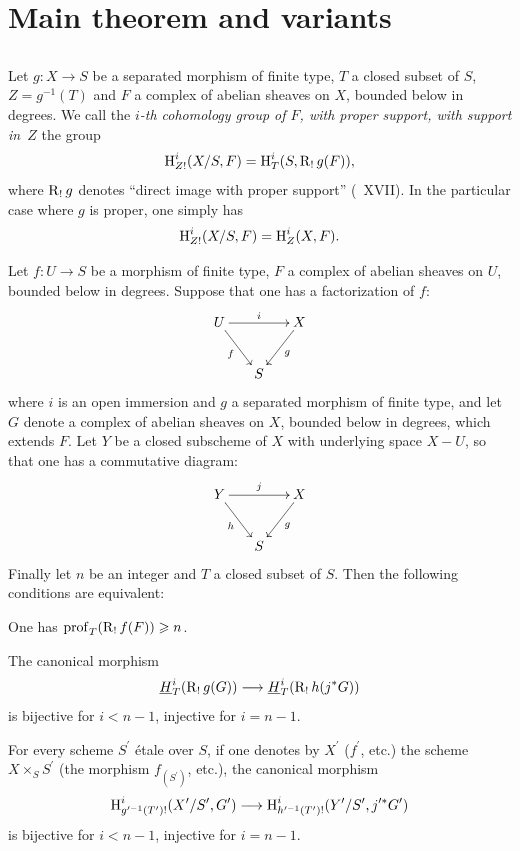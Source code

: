 \section{Main theorem and variants} \label{XIV.4}

\setcounter{subsection}{-1}

\subsection{} \label{XIV.4.0}
Let $g\colon X\to S$ be a separated morphism of finite type, $T$ a closed subset of $S$, \hbox{$Z=g^{-1}(T)$} and $F$ a complex of abelian sheaves on $X$, bounded below in degrees. We call the \emph{$i$-th cohomology group of $F$, with proper support, with support in~$Z$} the group
$$
\operatorname{H}_{Z!}^{i}(X/S, F)=\operatorname{H}_{T}^{i}(S, \operatorname{R}_{!}g(F)),
$$
where $\operatorname{R}_{!}g$ denotes ``direct image with proper support'' (~XVII). In the particular case where $g$ is proper, one simply has
$$
\operatorname{H}_{Z!}^{i}(X/S, F)=\operatorname{H}_{Z}^{i}(X, F).
$$

\begin{proposition} \label{XIV.4.1} Let $f\colon U\to S$ be a morphism of finite type, $F$ a complex of abelian sheaves on $U$, bounded below in degrees. Suppose that one has a factorization of $f$:
$$
\xymatrix@C=15pt{ U\ar[rr]^-{i}\ar[rd]_-{f} & & X\ar[ld]^-{g}\\
& S & }$$
where $i$ is an open immersion and $g$ a separated morphism of finite type, and let $G$ denote a complex of abelian sheaves on $X$, bounded below in degrees, which extends $F$. Let $Y$ be a closed subscheme of $X$ with underlying space $X-U$, so that one has a commutative diagram:
$$
\xymatrix@C=15pt{ Y\ar[rr]^-{j}\ar[rd]_-{h} & & X\ar[ld]^-{g}\\
& S & }$$
Finally let $n$ be an integer and $T$ a closed subset of $S$. Then the following conditions are equivalent:
\begin{enumeratei}
\item
One has $\operatorname{prof}_{T}(\operatorname{R}_{!}f(F))\geqslant n$.
\item
The canonical morphism
$$
\underline{H}_{T}^{i}(\R_{!}g(G))\to\underline{H}_{T}^{i}(\R_{!}h(j^{\ast}G))$$
is bijective for $i<n-1$, injective for $i=n-1$.
\item
For every scheme $S^{\prime}$ \'etale over $S$, if one denotes by $X^{\prime}$ (\resp $f^{\prime}$, \resp etc.) the scheme $X\times_{S}S^{\prime}$ (\resp the morphism $f_{(S^{\prime})}$, \resp etc.), the canonical morphism
$$
\H_{g^{\prime -1}(T^{\prime})!}^{i}(X^{\prime}/S^{\prime}, G^{\prime})\to\H_{h^{\prime -1}(T^{\prime})!}^{i}(Y^{\prime}/S^{\prime}, j^{\prime\ast}G^{\prime})$$
is bijective for $i<n-1$, injective for $i=n-1$.
\end{enumeratei}
\end{proposition}


